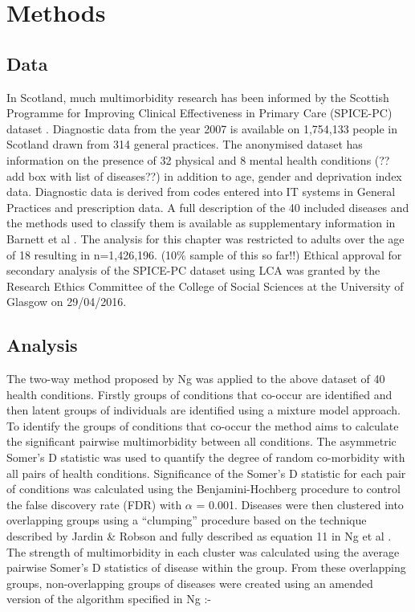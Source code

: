 \documentclass[12pt,]{report}
\begin{document}
\section{Methods}\label{sec:clust-methods}

\subsection{Data}\label{subsec:clust-data}

In Scotland, much multimorbidity research has been informed by the
Scottish Programme for Improving Clinical Effectiveness in Primary Care
(SPICE-PC) dataset \citep{RN292, RN33, RN159, RN148}. Diagnostic data
from the year 2007 is available on 1,754,133 people in Scotland drawn
from 314 general practices. The anonymised dataset has information on
the presence of 32 physical and 8 mental health conditions (?? add box
with list of diseases??) in addition to age, gender and deprivation
index data. Diagnostic data is derived from codes entered into IT
systems in General Practices and prescription data. A full description
of the 40 included diseases and the methods used to classify them is
available as supplementary information in Barnett et al
\citeyearpar{RN33}. The analysis for this chapter was restricted to
adults over the age of 18 resulting in n=1,426,196. (10\% sample of this
so far!!) Ethical approval for secondary analysis of the SPICE-PC
dataset using LCA was granted by the Research Ethics Committee of the
College of Social Sciences at the University of Glasgow on 29/04/2016.

\subsection{Analysis}\label{subsec:clust-analysis}

The two-way method proposed by Ng \citeyearpar{RN72} was applied to the
above dataset of 40 health conditions. Firstly groups of conditions that
co-occur are identified and then latent groups of individuals are
identified using a mixture model approach. To identify the groups of
conditions that co-occur the method aims to calculate the significant
pairwise multimorbidity between all conditions. The asymmetric Somer's D
statistic was used to quantify the degree of random co-morbidity with
all pairs of health conditions. Significance of the Somer's D statistic
for each pair of conditions was calculated using the Benjamini-Hochberg
procedure \citep{RN293} to control the false discovery rate (FDR) with
\(\alpha\) = 0.001. Diseases were then clustered into overlapping groups
using a ``clumping'' procedure based on the technique described by
Jardin \& Robson \citeyearpar{RN294} and fully described as equation 11
in Ng et al \citeyearpar{RN225}. The strength of multimorbidity in each
cluster was calculated using the average pairwise Somer's D statistics
of disease within the group. From these overlapping groups,
non-overlapping groups of diseases were created using an amended version
of the algorithm specified in Ng \citeyearpar{RN72}:-
\end{document}
